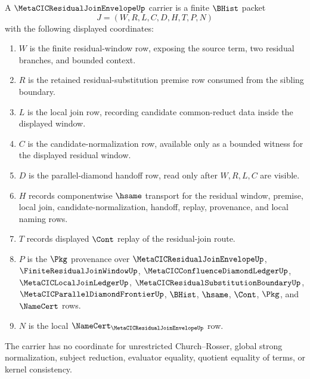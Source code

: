 \begin{definition}
\label{def:metacic-residual-join-envelope-carrier}
A $\MetaCICResidualJoinEnvelopeUp$ carrier is a finite $\BHist$ packet
$$
J=(W,R,L,C,D,H,T,P,N)
$$
with the following displayed coordinates:
\begin{enumerate}
\item $W$ is the finite residual-window row, exposing the source term, two residual branches, and bounded context.
\item $R$ is the retained residual-substitution premise row consumed from the sibling boundary.
\item $L$ is the local join row, recording candidate common-reduct data inside the displayed window.
\item $C$ is the candidate-normalization row, available only as a bounded witness for the displayed residual window.
\item $D$ is the parallel-diamond handoff row, read only after $W,R,L,C$ are visible.
\item $H$ records componentwise $\hsame$ transport for the residual window, premise, local join, candidate-normalization, handoff, replay, provenance, and local naming rows.
\item $T$ records displayed $\Cont$ replay of the residual-join route.
\item $P$ is the $\Pkg$ provenance over $\MetaCICResidualJoinEnvelopeUp$, $\FiniteResidualJoinWindowUp$, $\MetaCICConfluenceDiamondLedgerUp$, $\MetaCICLocalJoinLedgerUp$, $\MetaCICResidualSubstitutionBoundaryUp$, $\MetaCICParallelDiamondFrontierUp$, $\BHist$, $\hsame$, $\Cont$, $\Pkg$, and $\NameCert$ rows.
\item $N$ is the local $\NameCert_{\MetaCICResidualJoinEnvelopeUp}$ row.
\end{enumerate}
The carrier has no coordinate for unrestricted Church--Rosser, global strong normalization, subject reduction, evaluator equality, quotient equality of terms, or kernel consistency.
\end{definition}

